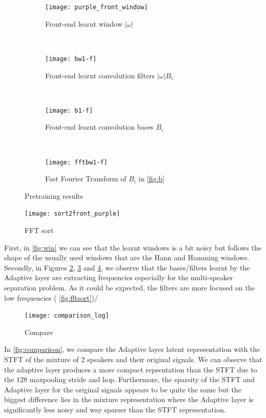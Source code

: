 \documentclass[master, tikz, final,11pt, dvipdfmx]{iscs-thesis}
\begin{document}
\begin{figure}[h]
\centering
\begin{subfigure}[b]{0.45\textwidth}
\texttt{[image: purple\_front\_window]}
\caption{Front-end learnt window $|\omega|$}
\label{fig:win} 
\end{subfigure}
~
\begin{subfigure}[b]{0.45\textwidth}
\texttt{[image: bw1-f]}
\captionsetup{justification=centering}
\caption{Front-end learnt convolution filters $|\omega| B_i$}
\label{fig:bw} 
\end{subfigure}
\\
\begin{subfigure}[b]{0.45\textwidth}
\texttt{[image: b1-f]}
\captionsetup{justification=centering}
\caption{Front-end learnt convolution bases $B_i$}
\label{fig:b} 
\end{subfigure}
~
\begin{subfigure}[b]{0.45\textwidth}
\texttt{[image: fftbw1-f]}
\captionsetup{justification=centering}
\caption{Fast Fourier Transform of $B_i$ in \autoref{fig:b}}
\label{fig:bfft} 
\end{subfigure}

\captionsetup{justification=centering}
\caption[Adaptive layer pretraining results]{Pretraining results}
\label{fig:pretrainingadapt} 

\end{figure}

\begin{figure}[h]
\centering
\texttt{[image: sort2front\_purple]}
\captionsetup{justification=centering}
\caption{FFT sort}
\label{fig:fftsort} 
\end{figure}



First, in \autoref{fig:win} we can see that the learnt windows is a bit noisy but follows the shape of the usually used windows that are the Hann and Hamming windows.
Secondly, in Figures \ref{fig:bw}, \ref{fig:b} and \ref{fig:bfft}, we observe that the bases/filters learnt by the Adaptive layer are extracting frequencies especially for the multi-speaker separation problem. As it could be expected, the filters are more focused on the low frequencies ( \autoref{fig:fftsort})/

\begin{figure}[h]
\centering
\texttt{[image: comparison\_log]}
\captionsetup{justification=centering}
\caption{Compare}
\label{fig:comparison} 
\end{figure}

In \autoref{fig:comparison}, we compare the Adaptive layer latent representation with the STFT of the mixture of 2 speakers and their original signals. We can observe that the adaptive layer produces a more compact repsentation than the STFT due to the $128$ maxpooling stride and hop. Furthermore, the sparsity of the STFT and Adaptive layer for the original signals appears to be quite the same but the biggest difference lies in the mixture representation where the Adaptive layer is significantly less noisy and way sparser than the STFT representation.
\end{document}
